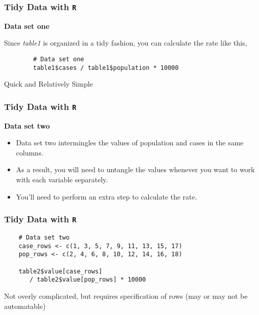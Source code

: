 \documentclass[TIDYMASTER.tex]{subfiles}
\begin{document}
\begin{frame}[fragile]
	\frametitle{Tidy Data with \texttt{R}}
	\Large
\noindent \textbf{Data set one}
	
	
	Since \textit{table1} is organized in a tidy fashion, you can calculate the rate like this,
	\begin{framed}
		\begin{verbatim}
		# Data set one
		table1$cases / table1$population * 10000
		\end{verbatim}
	\end{framed}
	Quick and Relatively Simple
\end{frame}
\begin{frame}[fragile]
	\frametitle{Tidy Data with \texttt{R}}
	\Large
\noindent \textbf{Data set two}	
\begin{itemize}
\item Data set two intermingles the values of population and cases in the same columns. 
\item As a result, you will need to untangle the values whenever you want to work with each variable separately.
\item You’ll need to perform an extra step to calculate the rate.
\end{itemize}
\end{frame}
\begin{frame}[fragile]
	\frametitle{Tidy Data with \texttt{R}}
	\Large
	\begin{framed}
	\begin{verbatim}
	# Data set two
	case_rows <- c(1, 3, 5, 7, 9, 11, 13, 15, 17)
	pop_rows <- c(2, 4, 6, 8, 10, 12, 14, 16, 18)
	
	table2$value[case_rows] 
	   / table2$value[pop_rows] * 10000
		\end{verbatim}
	\end{framed}
	Not overly complicated, but requires specification of rows (may or may not be automatable)
\end{frame}
\end{document}
